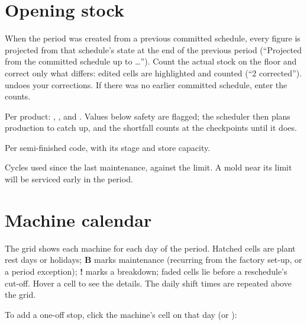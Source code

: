 \section{Opening stock}\label{sec:opening}


When the period was created from a previous committed schedule, every figure is projected from that
schedule's state at the end of the previous period (``Projected from the committed schedule up to \dots'').
Count the actual stock on the floor and correct only what differs: edited cells are highlighted and counted
(``2 corrected'').  undoes your corrections. If there was no earlier committed schedule,
enter the counts.

\begin{description}[style=nextline, leftmargin=1.2em, font=\bfseries\color{brand}]
  \item[Finished goods] Per product: , ,  and . Values below
        safety are flagged; the scheduler then plans production to catch up, and the shortfall counts at the
        checkpoints until it does.
  \item[Semi-finished (WIP)] Per semi-finished code, with its stage and store capacity.
  \item[Molds] Cycles used since the last maintenance, against the limit. A mold near its limit will be
        serviced early in the period.
\end{description}

\section{Machine calendar}\label{sec:period-calendar}


The grid shows each machine for each day of the period. Hatched cells are plant rest days or holidays;
\textbf{B} marks maintenance (recurring from the factory set-up, or a period exception); \textbf{!} marks a
breakdown; faded cells lie before a reschedule's cut-off. Hover a cell to see the details. The daily shift
times are repeated above the grid.

To add a one-off stop, click the machine's cell on that day (or ):

